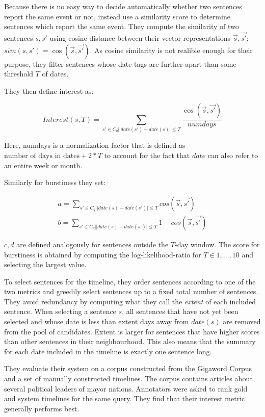 \documentclass[a4paper,BCOR=10mm]{report}
\numberwithin{lemma}{chapter}
\numberwithin{definition}{chapter}
\begin{document}
Because there is no easy way to decide automatically whether two sentences report the same event or not, \citeauthor{chieu} instead use a similarity score to determine sentences which report the same event. They compute the similarity of two sentences $s, s'$ using cosine distance between their vector representations $\vec{s}, \vec{s'}$: $\mathit{sim}(s, s') = \cos(\vec{s}, \vec{s'})$.
As cosine similarity is not realible enough for their purpose, they filter sentences whose date tags are further apart than some threshold $T$ of dates.

They then define interest as:

\begin{equation}
\mathit{Interest}(s, T) = \sum_{s' \in C_q | |\mathit{date}(s') - \mathit{date}(s)| \leq T} \frac{\cos(\vec{s}, \vec{s'})}{\mathit{numdays}}
\end{equation}

Here, numdays is a normalization factor that is defined as $\text{number of days in dates} + 2 * T$ to account for the fact that $\mathit{date}$ can also refer to an entire week or month.

Similarly for burstiness they set:

\begin{align}
a = \sum_{s' \in C_q | |\mathit{date}(s) - \mathit{date}(s')| \leq T} \mathit{cos}(\vec{s}, \vec{s'}) \\
b = \sum_{s' \in C_q | |\mathit{date}(s) - \mathit{date}(s')| \leq T} 1 - \mathit{cos}(\vec{s}, \vec{s'})
\end{align}

$c, d$ are defined analogously for sentences outside the $T$-day window. The score for burstiness is obtained by computing the log-likelihood-ratio for $T \in 1, ..., 10$ and selecting the largest value.

To select sentences for the timeline, they order sentences according to one of the two metrics and greedily select sentences up to a fixed total number of sentences.
They avoid redundancy by computing what they call the \textit{extent} of each included sentence. When selecting a sentence $s$, all sentences that have not yet been selected and whose date is less than extent days away from $\mathit{date}(s)$ are removed from the pool of candidates. Extent is larger for sentences that have higher scores than other sentences in their neighbourhood.
This also means that the summary for each date included in the timeline is exactly one sentence long.

They evaluate their system on a corpus constructed from the Gigaword Corpus \citep{gigaword} and a set of manually constructed timelines. The corpus contains articles about several political leaders of mayor nations. Annotators were asked to rank gold and system timelines for the same query.
They find that their interest metric generally performs best.
\end{document}
